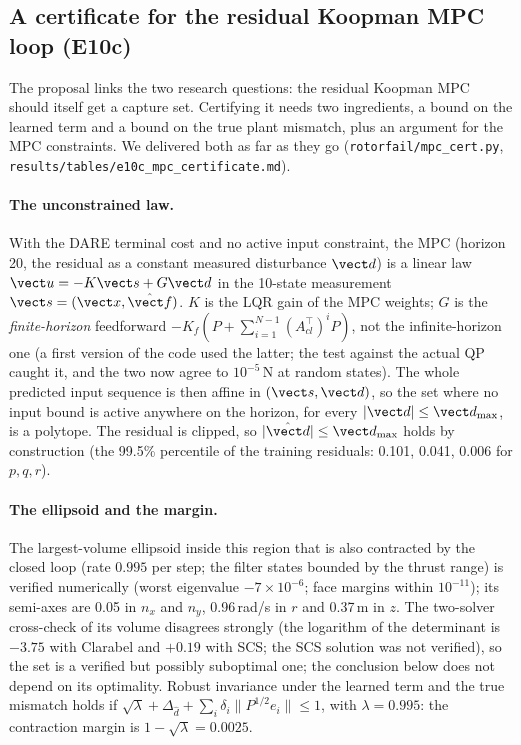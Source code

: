 \subsection{A certificate for the residual Koopman MPC loop (E10c)}\label{sec:mpccert}
The proposal links the two research questions: the residual Koopman MPC should itself get a capture set. Certifying it needs two ingredients, a bound on the learned term and a bound on the true plant mismatch, plus an argument for the MPC constraints. We delivered both as far as they go (\texttt{rotorfail/mpc\_cert.py}, \texttt{results/tables/e10c\_mpc\_certificate.md}).

\paragraph{The unconstrained law.} With the DARE terminal cost and no active input constraint, the MPC (horizon 20, the residual as a constant measured disturbance $\vect d$) is a linear law $\vect u=-K\vect s+G\vect d$ in the 10-state measurement $\vect s=(\vect x,\hat{\vect f})$. $K$ is the LQR gain of the MPC weights; $G$ is the \emph{finite-horizon} feedforward $-K_f(P+\sum_{i=1}^{N-1}(A_{cl}^\top)^iP)$, not the infinite-horizon one (a first version of the code used the latter; the test against the actual QP caught it, and the two now agree to $10^{-5}$\,N at random states). The whole predicted input sequence is then affine in $(\vect s,\vect d)$, so the set where no input bound is active anywhere on the horizon, for every $|\vect d|\le\vect d_{\max}$, is a polytope. The residual is clipped, so $|\hat{\vect d}|\le\vect d_{\max}$ holds by construction (the 99.5\% percentile of the training residuals: 0.101, 0.041, 0.006 for $p,q,r$).

\paragraph{The ellipsoid and the margin.} The largest-volume ellipsoid inside this region that is also contracted by the closed loop (rate $0.995$ per step; the filter states bounded by the thrust range) is verified numerically (worst eigenvalue $-7\times10^{-6}$; face margins within $10^{-11}$); its semi-axes are 0.05 in $n_x$ and $n_y$, 0.96\,rad/s in $r$ and 0.37\,m in $z$. The two-solver cross-check of its volume disagrees strongly (the logarithm of the determinant is $-3.75$ with Clarabel and $+0.19$ with SCS; the SCS solution was not verified), so the set is a verified but possibly suboptimal one; the conclusion below does not depend on its optimality. Robust invariance under the learned term and the true mismatch holds if $\sqrt\lambda+\Delta_{\hat d}+\sum_i\delta_i\|P^{1/2}e_i\|\le1$, with $\lambda=0.995$: the contraction margin is $1-\sqrt\lambda=0.0025$.

